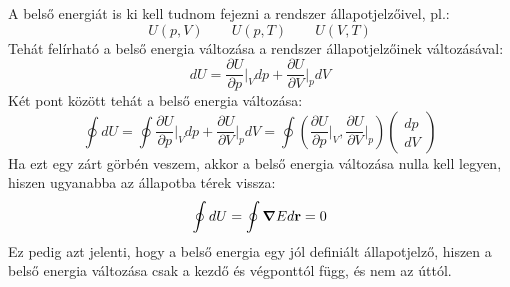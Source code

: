 \documentclass[../main.tex]{subfiles}
\begin{document}
A belső energiát is ki kell tudnom fejezni a rendszer állapotjelzőivel, pl.:
\begin{equation}
    U(p, V) \qquad U(p, T) \qquad U(V, T)
\end{equation}
Tehát felírható a belső energia változása a rendszer állapotjelzőinek változásával:
\begin{equation}
    dU = \frac{\partial U}{\partial p}\bigg|_{V} dp + \frac{\partial U}{\partial V}\bigg|_{p} dV
\end{equation}
Két pont között tehát a belső energia változása:
\begin{equation}
    \oint dU = \oint \frac{\partial U}{\partial p}\bigg|_{V} dp + \frac{\partial U}{\partial V}\bigg|_{p} dV = \oint \left(\frac{\partial U}{\partial p}\bigg|_{V}, \frac{\partial U}{\partial V}\bigg|_{p}\right)
    \begin{pmatrix}
        dp \\
        dV
    \end{pmatrix}
\end{equation}
Ha ezt egy zárt görbén veszem, akkor a belső energia változása nulla kell legyen, hiszen ugyanabba az állapotba térek vissza:
\begin{equation}
    \oint dU = \oint \boldsymbol{\nabla} E d \bold{r} = 0
\end{equation}
Ez pedig azt jelenti, hogy a belső energia egy jól definiált állapotjelző, hiszen a belső energia változása csak a kezdő és végponttól függ, és nem az úttól.
\end{document}
